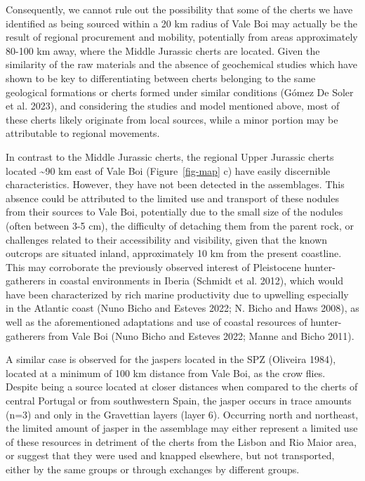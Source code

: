 \documentclass[
  a4paper,
  DIV=11,
  numbers=noendperiod]{scrreprt}
\begin{document}
Consequently, we cannot rule out the possibility that some of the cherts
we have identified as being sourced within a 20 km radius of Vale Boi
may actually be the result of regional procurement and mobility,
potentially from areas approximately 80-100 km away, where the Middle
Jurassic cherts are located. Given the similarity of the raw materials
and the absence of geochemical studies which have shown to be key to
differentiating between cherts belonging to the same geological
formations or cherts formed under similar conditions (Gómez De Soler et
al. 2023), and considering the studies and model mentioned above, most
of these cherts likely originate from local sources, while a minor
portion may be attributable to regional movements.

In contrast to the Middle Jurassic cherts, the regional Upper Jurassic
cherts located \textasciitilde90 km east of Vale Boi
(Figure~\ref{fig-map} c) have easily discernible characteristics.
However, they have not been detected in the assemblages. This absence
could be attributed to the limited use and transport of these nodules
from their sources to Vale Boi, potentially due to the small size of the
nodules (often between 3-5 cm), the difficulty of detaching them from
the parent rock, or challenges related to their accessibility and
visibility, given that the known outcrops are situated inland,
approximately 10 km from the present coastline. This may corroborate the
previously observed interest of Pleistocene hunter-gatherers in coastal
environments in Iberia (Schmidt et al. 2012), which would have been
characterized by rich marine productivity due to upwelling especially in
the Atlantic coast (Nuno Bicho and Esteves 2022; N. Bicho and Haws
2008), as well as the aforementioned adaptations and use of coastal
resources of hunter-gatherers from Vale Boi (Nuno Bicho and Esteves
2022; Manne and Bicho 2011).

A similar case is observed for the jaspers located in the SPZ (Oliveira
1984), located at a minimum of 100 km distance from Vale Boi, as the
crow flies. Despite being a source located at closer distances when
compared to the cherts of central Portugal or from southwestern Spain,
the jasper occurs in trace amounts (n=3) and only in the Gravettian
layers (layer 6). Occurring north and northeast, the limited amount of
jasper in the assemblage may either represent a limited use of these
resources in detriment of the cherts from the Lisbon and Rio Maior area,
or suggest that they were used and knapped elsewhere, but not
transported, either by the same groups or through exchanges by different
groups.
\end{document}
